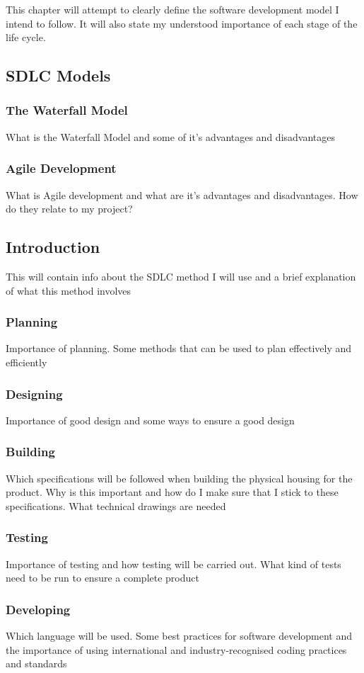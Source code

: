 \documentclass[10pt,a4paper]{article}
\begin{document}
This chapter will attempt to clearly define the software development model I intend to follow. It will also state my understood importance of each stage of the life cycle. 
\subsection{SDLC Models}
\subsubsection{The Waterfall Model}
What is the Waterfall Model and some of it's advantages and disadvantages
\subsubsection{Agile Development}
What is Agile development and what are it's advantages and disadvantages. How do they relate to my project? 

\subsection{Introduction}
This will contain info about the SDLC method I will use and a brief explanation of what this method involves
\subsubsection{Planning}
Importance of planning. Some methods that can be used to plan effectively and efficiently
\subsubsection{Designing}
Importance of good design and some ways to ensure a good design 
\subsubsection{Building}
Which specifications will be followed when building the physical housing for the product. Why is this important and how do I make sure that I stick to these specifications. What technical drawings are needed
\subsubsection{Testing}
Importance of testing and how testing will be carried out. What kind of tests need to be run to ensure a complete product
\subsubsection{Developing}
Which language will be used. Some best practices for software development and the importance of using international and industry-recognised coding practices and standards 
\end{document}
